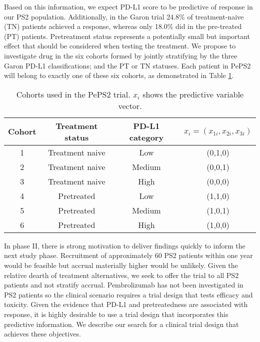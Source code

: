\documentclass[graybox]{svmult}
\begin{document}
Based on this information, we expect PD-L1 score to be predictive of response in our PS2 population.
Additionally, %
in the Garon trial 24.8\% of treatment-naive (TN) patients achieved a response, whereas only 18.0\% did in the pre-treated (PT) patients.
Pretreatment status represents a potentially small but important effect that should be considered when testing the treatment.
We propose to investigate drug in the six cohorts formed by jointly stratifying by the three Garon PD-L1 classifications; and the PT or TN statuses. 
Each patient in PePS2 will belong to exactly one of these six cohorts, as demonstrated in Table \ref{tab:bebop:cohorts}.

\begin{table}
	\centering
	\begin{tabular}{|c|c|c|c|}
		\hline Cohort & Treatment status & PD-L1 category & $x_i = (x_{1i}, x_{2i}, x_{3i})$ \\ 
		\hline 
		1 & Treatment naive & Low & (0,1,0) \\ 
		2 & Treatment naive & Medium & (0,0,1) \\ 
		3 & Treatment naive & High & (0,0,0) \\ 
		4 & Pretreated & Low & (1,1,0) \\ 
		5 & Pretreated & Medium & (1,0,1) \\ 
		6 & Pretreated & High & (1,0,0) \\ 
		\hline 
	\end{tabular} 
	\caption{Cohorts used in the PePS2 trial. $x_i$ shows the predictive variable vector.}
	\label{tab:bebop:cohorts}
\end{table}

In phase II, there is strong motivation to deliver findings quickly to inform the next study phase.
Recruitment of approximately 60 PS2 patients within one year would be feasible but accrual materially higher would be unlikely. 
Given the relative dearth of treatment alternatives, we seek to offer the trial to all PS2 patients and not stratify accrual.
Pembrolizumab has not been investigated in PS2 patients so the clinical scenario requires a trial design that tests efficacy and toxicity.
Given the evidence that PD-L1 and pretreatedness are associated with response, it is highly desirable to use a trial design that incorporates this predictive information.
We describe our search for a clinical trial design that achieves these objectives.
\end{document}
